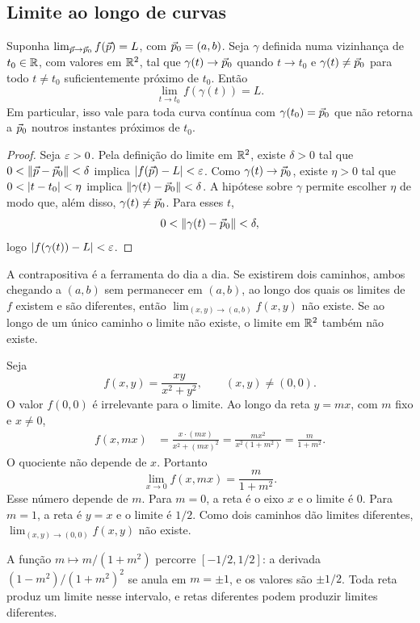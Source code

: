 \documentclass[11pt,a4paper]{article}
\begin{document}
\subsection{Limite ao longo de curvas}

\begin{teorema}
Suponha $\lim_{\vec{p}\to\vec{p}_0} f(\vec{p})=L$, com $\vec{p}_0=(a,b)$. Seja $\gamma$ definida numa vizinhança de $t_0\in\mathbb{R}$, com valores em $\mathbb{R}^2$, tal que $\gamma(t)\to\vec{p}_0$ quando $t\to t_0$ e $\gamma(t)\neq\vec{p}_0$ para todo $t\neq t_0$ suficientemente próximo de $t_0$. Então
\[
\lim_{t\to t_0} f(\gamma(t))=L.
\]
Em particular, isso vale para toda curva contínua com $\gamma(t_0)=\vec{p}_0$ que não retorna a $\vec{p}_0$ noutros instantes próximos de $t_0$.
\end{teorema}

\begin{proof}
Seja $\varepsilon>0$. Pela definição do limite em $\mathbb{R}^2$, existe $\delta>0$ tal que $0<\left\lVert \vec{p}-\vec{p}_0 \right\rVert<\delta$ implica $\left\lvert f(\vec{p})-L \right\rvert<\varepsilon$. Como $\gamma(t)\to\vec{p}_0$, existe $\eta>0$ tal que $0<\left\lvert t-t_0 \right\rvert<\eta$ implica $\left\lVert \gamma(t)-\vec{p}_0 \right\rVert<\delta$. A hipótese sobre $\gamma$ permite escolher $\eta$ de modo que, além disso, $\gamma(t)\neq\vec{p}_0$. Para esses $t$,
\[
0<\left\lVert \gamma(t)-\vec{p}_0 \right\rVert<\delta,
\]
logo $\left\lvert f(\gamma(t))-L \right\rvert<\varepsilon$.
\end{proof}

A contrapositiva é a ferramenta do dia a dia. Se existirem dois caminhos, ambos chegando a $(a,b)$ sem permanecer em $(a,b)$, ao longo dos quais os limites de $f$ existem e são diferentes, então $\lim_{(x,y)\to(a,b)} f(x,y)$ não existe. Se ao longo de um único caminho o limite não existe, o limite em $\mathbb{R}^2$ também não existe.


\begin{contraexemplo}
Seja
\[
f(x,y)=\frac{xy}{x^2+y^2},\qquad (x,y)\neq(0,0).
\]
O valor $f(0,0)$ é irrelevante para o limite. Ao longo da reta $y=mx$, com $m$ fixo e $x\neq 0$,
\begin{align*}
f(x,mx)
&=\frac{x\cdot(mx)}{x^2+(mx)^2}
=\frac{m x^2}{x^2(1+m^2)}
=\frac{m}{1+m^2}.
\end{align*}
O quociente não depende de $x$. Portanto
\[
\lim_{x\to 0} f(x,mx)=\frac{m}{1+m^2}.
\]
Esse número depende de $m$. Para $m=0$, a reta é o eixo $x$ e o limite é $0$. Para $m=1$, a reta é $y=x$ e o limite é $1/2$. Como dois caminhos dão limites diferentes, $\lim_{(x,y)\to(0,0)} f(x,y)$ não existe.

A função $m\mapsto m/(1+m^2)$ percorre $[-1/2,1/2]$: a derivada $(1-m^2)/(1+m^2)^2$ se anula em $m=\pm 1$, e os valores são $\pm 1/2$. Toda reta produz um limite nesse intervalo, e retas diferentes podem produzir limites diferentes.
\end{contraexemplo}
\end{document}
